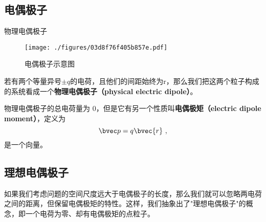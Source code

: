 


\subsection{电偶极子}



\begin{definition}{物理电偶极子}
\begin{figure}[ht]
\centering
\texttt{[image: ./figures/03d8f76f405b857e.pdf]}
\caption{电偶极子示意图} \label{fig_eleDpl_1}
\end{figure}
若有两个等量异号$\pm q$的电荷，且他们的间距始终为r，那么我们把这两个粒子构成的系统看成一个\textbf{物理电偶极子（physical electric dipole）}。

物理电偶极子的总电荷量为 $0$，但是它有另一个性质叫\textbf{电偶极矩（electric dipole moment）}，定义为 
\begin{equation}
\bvec p = q\bvec{r}~,
\end{equation}
是一个向量。
\end{definition}

\subsection{理想电偶极子}
如果我们考虑问题的空间尺度远大于电偶极子的长度，那么我们就可以忽略两电荷之间的距离，但保留电偶极矩的特性。这样，我们抽象出了"理想电偶极子"的概念，即一个电荷为零、却有电偶极矩的点粒子。



